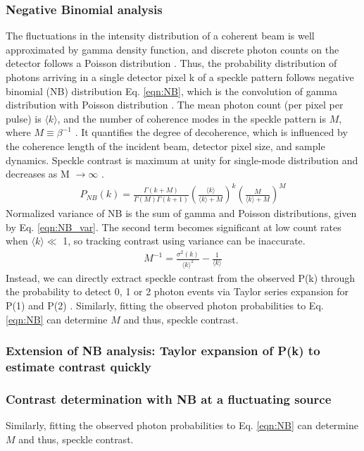 \documentclass[11pt]{article}
\theoremstyle{definition}
\newcommand{\kk}{\langle k \rangle}
\begin{document}
\subsubsection{Negative Binomial analysis}
The fluctuations in the intensity distribution of a coherent beam is well approximated by gamma density function, and discrete photon counts on the detector follows a Poisson distribution \cite{goodman_speckle_2020}. Thus, the probability distribution of photons arriving in a single detector pixel k of a speckle pattern follows negative binomial (NB) distribution Eq. \ref{eqn:NB}, which is the convolution of gamma distribution with Poisson distribution \cite{goodman_speckle_2020}. The mean photon count (per pixel per pulse) is $\kk$, and the number of coherence modes in the speckle pattern is \( M \), where \(M \equiv \beta^{-1} \) \cite{hruszkewycz_high_2012}. It quantifies the degree of decoherence, which is influenced by the coherence length of the incident beam, detector pixel size, and sample dynamics. Speckle contrast is maximum at unity for single-mode distribution and decreases as M $\rightarrow \infty$ \cite{hruszkewycz_high_2012}. 
\begin{align}\label{eqn:NB}
P_{NB}(k) = \frac{\Gamma(k+M)}{\Gamma(M)\Gamma(k+1)} \left(\frac{\kk}{\kk+M}\right)^k \left(\frac{M}{\kk +M}\right)^M
\end{align}
Normalized variance of NB is the sum of gamma and Poisson distributions, given by Eq. \ref{eqn:NB_var}. The second term becomes significant at low count rates when $\langle k \rangle \ll$ 1, so tracking contrast using variance can be inaccurate. 
\begin{align}\label{eqn:NB_var}
M^{-1} = \frac{\sigma^2(k)}{\kk^2} - \frac{1}{\kk}
\end{align}
Instead, we can directly extract speckle contrast from the observed P(k) through the probability to detect 0, 1 or 2 photon events via Taylor series expansion for P(1) and P(2) \cite{hruszkewycz_high_2012}. Similarly, fitting the observed photon probabilities to Eq. \ref{eqn:NB} can determine \( M \) and thus, speckle contrast.
\subsubsection{Extension of NB analysis: Taylor expansion of P(k) to estimate contrast quickly}

\subsubsection{Contrast determination with NB at a fluctuating source}
Similarly, fitting the observed photon probabilities to Eq. \ref{eqn:NB} can determine \( M \) and thus, speckle contrast.
\end{document}
